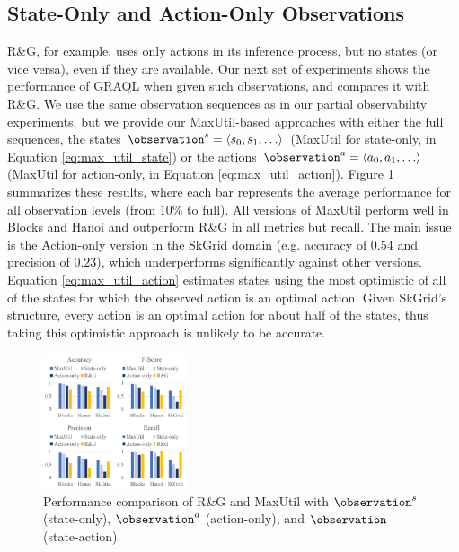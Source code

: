 \documentclass[letterpaper]{article} %
\begin{document}
\subsection{State-Only and Action-Only Observations}

R\&G, for example, uses only actions in its inference process, but no states (or vice versa), even if they are available. 
Our next set of experiments shows the performance of GRAQL when given such observations, and compares it with R\&G. 
We use the same observation sequences as in our partial observability experiments, but we provide our MaxUtil-based approaches with either the full sequences, the states $\observation^s = \langle s_0, s_1, \ldots \rangle$ (MaxUtil for state-only, in Equation \ref{eq:max_util_state}) or the actions $\observation^a = \langle a_0, a_1, \ldots \rangle$ (MaxUtil for action-only, in Equation \ref{eq:max_util_action}). 
%
Figure \ref{fig:simpler_obs} summarizes these results, where each bar represents the average performance for all observation levels (from $10\%$ to full). 
All versions of MaxUtil perform well in Blocks and Hanoi and outperform R\&G in all metrics but recall. 
The main issue is the Action-only version in the SkGrid domain (e.g. accuracy of $0.54$ and precision of $0.23$), which underperforms significantly against other versions. 
Equation \ref{eq:max_util_action} estimates states using the most optimistic of all of the states for which the observed action is an optimal action. 
Given SkGrid's structure, every action is an optimal action for about half of the states, thus taking this optimistic approach is unlikely to be accurate.

\begin{figure}[!b]
    \centering
    \includegraphics[width=0.38\textwidth]{Figures/simpler_observations.pdf}
    \caption{Performance comparison of R\&G and MaxUtil with $\observation^s$ (state-only), $\observation^a$ (action-only), and $\observation$ (state-action).}
    \label{fig:simpler_obs}
\end{figure}
\end{document}
